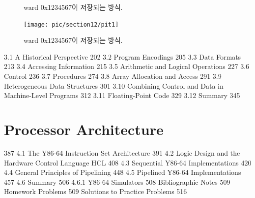 \documentclass[chapter,oneside]{oblivoir}
\begin{document}
\begin{figure}[h!]
    \centering
    \caption{ward 0x1234567이 저장되는 방식.}
\end{figure}




\begin{figure}[h!]
    \centering
    \texttt{[image: pic/section12/pit1]}
    \caption{ward 0x1234567이 저장되는 방식.}
\end{figure}





3.1 A Historical Perspective 202
3.2 Program Encodings 205
3.3 Data Formats 213
3.4 Accessing Information 215
3.5 Arithmetic and Logical Operations 227
3.6 Control 236
3.7 Procedures 274
3.8 Array Allocation and Access 291
3.9 Heterogeneous Data Structures 301
3.10 Combining Control and Data in Machine-Level Programs 312
3.11 Floating-Point Code 329
3.12 Summary 345

\chapter{Processor Architecture}

387
4.1 The Y86-64 Instruction Set Architecture 391
4.2 Logic Design and the Hardware Control Language HCL 408
4.3 Sequential Y86-64 Implementations 420
4.4 General Principles of Pipelining 448
4.5 Pipelined Y86-64 Implementations 457
4.6 Summary 506
4.6.1 Y86-64 Simulators 508
Bibliographic Notes 509
Homework Problems 509
Solutions to Practice Problems 516










\end{document}
